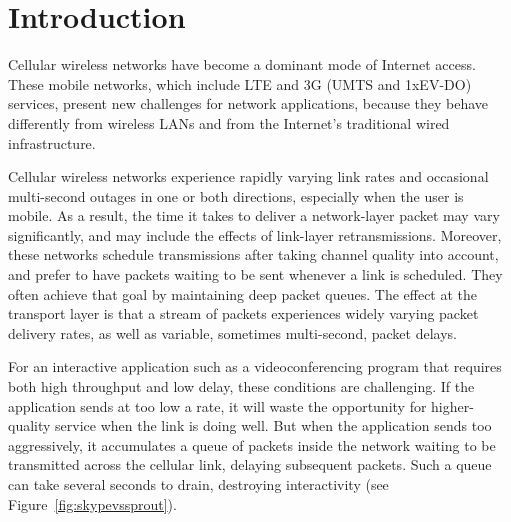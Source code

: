 \section{Introduction}
\label{sprout:intro}

Cellular wireless networks have become a dominant mode of Internet
access. These mobile networks, which include LTE and 3G (UMTS and
1xEV-DO) services, present new challenges for network applications,
because they behave differently from wireless LANs and from the
Internet's traditional wired infrastructure.

Cellular wireless networks experience rapidly varying link rates
and occasional multi-second outages in one or both directions,
especially when the user is mobile. As a result, the time it takes to
deliver a network-layer packet may vary significantly, and may include
the effects of link-layer retransmissions. Moreover, these networks
schedule transmissions after taking channel quality into account, and
prefer to have packets waiting to be sent whenever a link is
scheduled. They often achieve that goal by maintaining deep packet
queues. The effect at the transport layer is that a stream of packets
experiences widely varying packet delivery rates, as well as variable,
sometimes multi-second, packet delays.



For an interactive application such as a videoconferencing program
that requires both high throughput and low delay, these conditions are
challenging. If the application sends at too low a rate, it will waste
the opportunity for higher-quality service when the link is
doing well. But when the application sends too aggressively, it
accumulates a queue of packets inside the network waiting to be
transmitted across the cellular link, delaying subsequent
packets. Such a queue can take several seconds to drain, destroying
interactivity (see Figure~\ref{fig:skypevssprout}).


